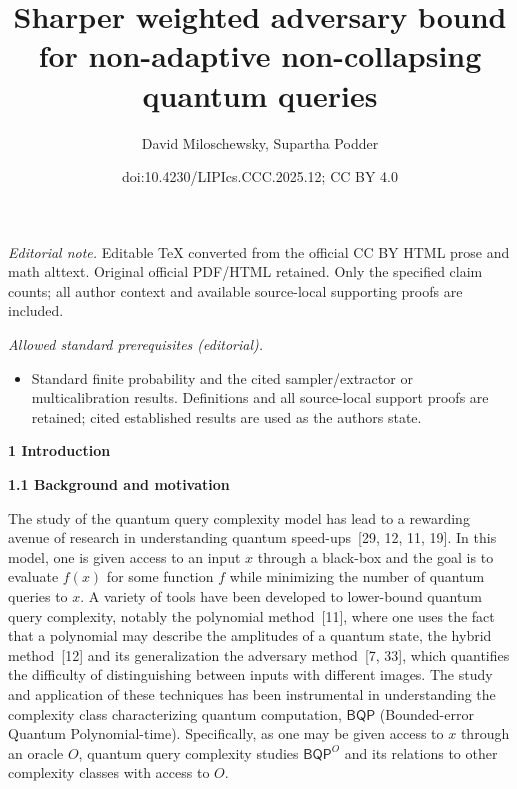 \documentclass[10pt,a4paper]{article}
\title{Sharper weighted adversary bound for non-adaptive non-collapsing quantum queries}
\author{David Miloschewsky, Supartha Podder}
\date{doi:10.4230/LIPIcs.CCC.2025.12; CC BY 4.0}
\begin{document}
\maketitle
\noindent\textit{Editorial note.} Editable TeX converted from the official CC BY HTML prose and math alttext. Original official PDF/HTML retained. Only the specified claim counts; all author context and available source-local supporting proofs are included.\par\medskip
\noindent\textit{Allowed standard prerequisites (editorial).}\begin{itemize}
\item Standard finite probability and the cited sampler/extractor or multicalibration results. Definitions and all source-local support proofs are retained; cited established results are used as the authors state.
\end{itemize}\medskip


\par\medskip\noindent\textbf{
1 Introduction}\par




\par\medskip\noindent\textbf{
1.1 Background and motivation}\par




The study of the quantum query complexity model has lead to a rewarding avenue of research in understanding quantum speed-ups [29, 12, 11, 19]. In this model, one is given access to an input $x$ through a black-box and the goal is to evaluate $f(x)$ for some function $f$ while minimizing the number of quantum queries to $x$. A variety of tools have been developed to lower-bound quantum query complexity, notably the polynomial method [11], where one uses the fact that a polynomial may describe the amplitudes of a quantum state, the hybrid method [12] and its generalization the adversary method [7, 33], which quantifies the difficulty of distinguishing between inputs with different images. The study and application of these techniques has been instrumental in understanding the complexity class characterizing quantum computation, $\mathsf{BQP}$ (Bounded-error Quantum Polynomial-time). Specifically, as one may be given access to $x$ through an oracle $O$, quantum query complexity studies $\mathsf{BQP}^{O}$ and its relations to other complexity classes with access to $O$.\par
\end{document}
